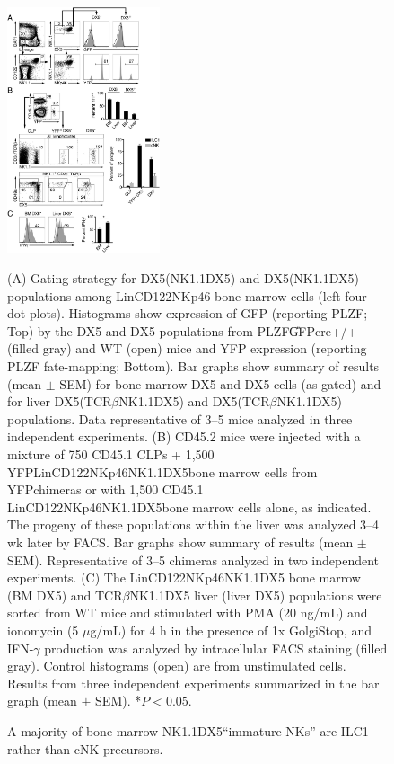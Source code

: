 \begin{figure}[p]
\begin{center}
	\includegraphics[width=0.4\textwidth]{figures/chapter2/F2}
\end{center}
	\caption{A majority of bone marrow NK1.1\UP DX5\UM “immature NKs” are ILC1 rather than cNK precursors.} 
	(A) Gating strategy for DX5\UM (NK1.1\UP DX5\UM) and DX5\UP (NK1.1\UP DX5\UP) populations among Lin\UM CD122\UP NKp46\UP{} bone marrow cells (left four dot plots). Histograms show expression of GFP (reporting PLZF; Top) by the DX5\UM{} and DX5\UP{} populations from PLZF\U{GFPcre+/+} (filled gray) and WT (open) mice and YFP expression (reporting PLZF fate-mapping; Bottom). Bar graphs show summary of results (mean $\pm$ SEM) for bone marrow DX5\UM{} and DX5\UP{} cells (as gated) and for liver DX5\UM (\CDte\UM TCR$\beta$\UM NK1.1\UP DX5\UM) and DX5\UP (\CDte\UM TCR$\beta$\UM NK1.1\UP DX5\UP) populations. Data representative of 3–5 mice analyzed in three independent experiments. (B) CD45.2 \Ragrg mice were injected with a mixture of 750 CD45.1 CLPs + 1,500 YFP\UP Lin\UM CD122\UP NKp46\UP NK1.1\UP DX5\UM bone marrow cells from YFP\UM chimeras or with 1,500 CD45.1 Lin\UM CD122\UP NKp46\UP NK1.1\UP DX5\UM bone marrow cells alone, as indicated. The progeny of these populations within the liver was analyzed 3–4 wk later by FACS. Bar graphs show summary of results (mean $\pm$ SEM). Representative of 3–5 chimeras analyzed in two independent experiments. (C) The Lin\UM CD122\UP NKp46\UP NK1.1\UP DX5\UM{} bone marrow (BM DX5\UM) and \CDte\UM TCR$\beta$\UM NK1.1\UP DX5\UM{} liver (liver DX5\UM) populations were sorted from WT mice and stimulated with PMA (20 ng/mL) and ionomycin (5 $\mu$g/mL) for 4 h in the presence of 1x GolgiStop, and IFN-$\gamma$ production was analyzed by intracellular FACS staining (filled gray). Control histograms (open) are from unstimulated cells. Results from three independent experiments summarized in the bar graph (mean $\pm$ SEM). *$P < 0.05$.
	\label{fig:chap2_F2}
\end{figure}

